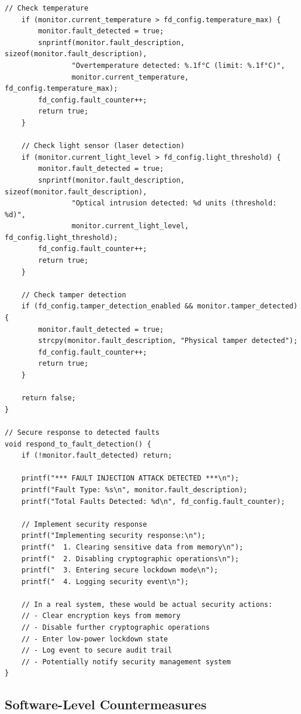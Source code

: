 \documentclass[12pt,a4paper]{article}
\begin{document}
\begin{lstlisting}[caption={Hardware Fault Detection System}]
    // Check temperature
    if (monitor.current_temperature > fd_config.temperature_max) {
        monitor.fault_detected = true;
        snprintf(monitor.fault_description, sizeof(monitor.fault_description),
                "Overtemperature detected: %.1f°C (limit: %.1f°C)",
                monitor.current_temperature, fd_config.temperature_max);
        fd_config.fault_counter++;
        return true;
    }
    
    // Check light sensor (laser detection)
    if (monitor.current_light_level > fd_config.light_threshold) {
        monitor.fault_detected = true;
        snprintf(monitor.fault_description, sizeof(monitor.fault_description),
                "Optical intrusion detected: %d units (threshold: %d)",
                monitor.current_light_level, fd_config.light_threshold);
        fd_config.fault_counter++;
        return true;
    }
    
    // Check tamper detection
    if (fd_config.tamper_detection_enabled && monitor.tamper_detected) {
        monitor.fault_detected = true;
        strcpy(monitor.fault_description, "Physical tamper detected");
        fd_config.fault_counter++;
        return true;
    }
    
    return false;
}

// Secure response to detected faults
void respond_to_fault_detection() {
    if (!monitor.fault_detected) return;
    
    printf("*** FAULT INJECTION ATTACK DETECTED ***\n");
    printf("Fault Type: %s\n", monitor.fault_description);
    printf("Total Faults Detected: %d\n", fd_config.fault_counter);
    
    // Implement security response
    printf("Implementing security response:\n");
    printf("  1. Clearing sensitive data from memory\n");
    printf("  2. Disabling cryptographic operations\n");
    printf("  3. Entering secure lockdown mode\n");
    printf("  4. Logging security event\n");
    
    // In a real system, these would be actual security actions:
    // - Clear encryption keys from memory
    // - Disable further cryptographic operations
    // - Enter low-power lockdown state
    // - Log event to secure audit trail
    // - Potentially notify security management system
}
\end{lstlisting}

\subsection{Software-Level Countermeasures}
\end{document}
